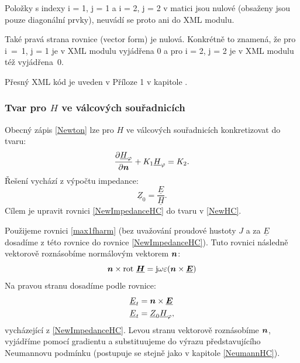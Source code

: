 \documentclass[12pt,a4paper,oneside]{article}
\numberwithin{equation}{section} %
\numberwithin{figure}{section} %
\numberwithin{table}{section} %
\newcommand{\mj}{\mathrm{j}} %
\renewcommand{\vec}[1]{\mbox{\boldmath$#1$}} %
\newcommand{\faz}[1]{{\underline{#1}}} %
\newcommand{\rot}{\mathrm{rot}\ }
\begin{document}
Položky s indexy i = 1, j = 1 a i = 2, j = 2 v matici jsou nulové (obsaženy jsou pouze diagonální prvky), neuvádí se proto ani do XML modulu.

Také pravá strana rovnice (vector form) je nulová. Konkrétně to znamená, že pro i~=~1, j = 1 je v XML modulu vyjádřena $0$ a pro i = 2, j = 2 je v XML modulu též vyjádřena~$0$.

Přesný XML kód je uveden v Příloze 1 v kapitole .



\subsubsection*{Tvar pro \faz{\vec{H}} ve válcových souřadnicích}
Obecný zápis \ref{Newton} lze pro \faz{\vec{H}} ve válcových souřadnicích konkretizovat do tvaru:
\begin{equation}
\label{NewHC}
\frac{\partial \faz{H} _{\varphi}}{\partial \vec{n}} + K_1 \faz{H} _{\varphi} = K_2 .
\end{equation}
Řešení vychází z výpočtu impedance: 
\begin{equation}
\label{NewImpedanceHC}
\faz{Z} _0 = \frac{\faz{E}}{\faz{H}} .
\end{equation}
Cílem je upravit rovnici \ref{NewImpedanceHC} do tvaru v \ref{NewHC}.

Použijeme rovnici \ref{max1fharm} (bez uvažování proudové hustoty $J$ a za $\faz{E}$ dosadíme z této rovnice do rovnice \ref{NewImpedanceHC}). Tuto rovnici následně vektorově roznásobíme normálovým vektorem $\vec{n}$:
\begin{equation}
\vec{n} \times \rot \faz{\vec{H}} = \mj \omega \varepsilon (\vec{n} \times \faz{\vec{E}})
\end{equation}
Na pravou stranu dosadíme podle rovnice:
\begin{subequations}
\begin{align}
\faz{E} _t &= \vec{n} \times \faz{\vec{E}}
\\
\faz{E} _t &= \faz{Z} _0 \faz{H} _{\varphi} ,
\end{align}
\end{subequations}
vycházející z \ref{NewImpedanceHC}. Levou stranu vektorově roznásobíme $\vec{n}$, vyjádříme pomocí gradientu a substituujeme do výrazu představujícího Neumannovu podmínku (postupuje se stejně jako v kapitole \ref{NeumannHC}).
\end{document}
